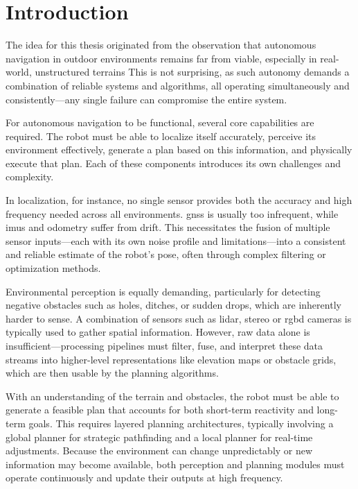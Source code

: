 \chapter{Introduction}\label{ch:introduction}
\glsresetall

The idea for this thesis originated from the observation that autonomous navigation in outdoor environments remains far from viable, especially in real-world, unstructured terrains
This is not surprising, as such autonomy demands a combination of reliable systems and algorithms, all operating simultaneously and consistently---any single failure can compromise the entire system.

For autonomous navigation to be functional, several core capabilities are required.
The robot must be able to localize itself accurately, perceive its environment effectively, generate a plan based on this information, and physically execute that plan.
Each of these components introduces its own challenges and complexity.

In localization, for instance, no single sensor provides both the accuracy and high frequency needed across all environments.
\gls{gnss} is usually too infrequent, while \glspl{imu} and odometry suffer from drift.
This necessitates the fusion of multiple sensor inputs---each with its own noise profile and limitations---into a consistent and reliable estimate of the robot’s pose, often through complex filtering or optimization methods.

Environmental perception is equally demanding, particularly for detecting negative obstacles such as holes, ditches,
or sudden drops, which are inherently harder to sense.
A combination of sensors such as \gls{lidar}, stereo or \gls{rgbd} cameras is typically used to gather spatial information.
However, raw data alone is insufficient---processing pipelines must filter, fuse, and interpret these data streams into
higher-level representations like elevation maps or obstacle grids, which are then usable by the planning algorithms.

With an understanding of the terrain and obstacles, the robot must be able to generate a feasible plan that accounts for
both short-term reactivity and long-term goals.
This requires layered planning architectures, typically involving a global planner for strategic pathfinding and a local
planner for real-time adjustments.
Because the environment can change unpredictably or new information may become available, both perception and planning
modules must operate continuously and update their outputs at high frequency.

